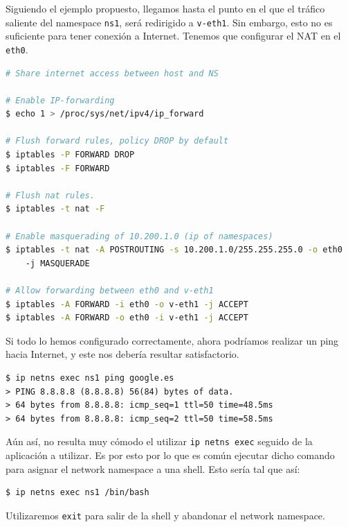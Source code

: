 \documentclass[a4paper, oneside, 12pt]{book}
\begin{document}
	\pagebreak

	\par \noindent Siguiendo el ejemplo propuesto, llegamos hasta el punto en el que el tráfico saliente del namespace \texttt{ns1}, será redirigido a \texttt{v-eth1}. Sin embargo, esto no es suficiente para tener conexión a Internet. Tenemos que configurar el NAT en el \texttt{eth0}.
	
	\begin{lstlisting}[language=bash, caption=Configuración de NAT para dar Internet a un network namespace]
# Share internet access between host and NS

# Enable IP-forwarding
$ echo 1 > /proc/sys/net/ipv4/ip_forward

# Flush forward rules, policy DROP by default
$ iptables -P FORWARD DROP
$ iptables -F FORWARD

# Flush nat rules.
$ iptables -t nat -F

# Enable masquerading of 10.200.1.0 (ip of namespaces)
$ iptables -t nat -A POSTROUTING -s 10.200.1.0/255.255.255.0 -o eth0 
	-j MASQUERADE

# Allow forwarding between eth0 and v-eth1
$ iptables -A FORWARD -i eth0 -o v-eth1 -j ACCEPT
$ iptables -A FORWARD -o eth0 -i v-eth1 -j ACCEPT
	\end{lstlisting}
	
	\addvspace{10px}
	
	\par \noindent Si todo lo hemos configurado correctamente, ahora podríamos realizar un ping hacia Internet, y este nos debería resultar satisfactorio.
	\begin{verbatim}
$ ip netns exec ns1 ping google.es
> PING 8.8.8.8 (8.8.8.8) 56(84) bytes of data.
> 64 bytes from 8.8.8.8: icmp_seq=1 ttl=50 time=48.5ms
> 64 bytes from 8.8.8.8: icmp_seq=2 ttl=50 time=58.5ms
	\end{verbatim}

	\addvspace{10px}
	
	\par \noindent Aún así, no resulta muy cómodo el utilizar \texttt{ip netns exec} seguido de la aplicación a utilizar. Es por esto por lo que es común ejecutar dicho comando para asignar el network namespace a una shell. Esto sería tal que así:
	\begin{verbatim}
$ ip netns exec ns1 /bin/bash
	\end{verbatim}
	\par \noindent Utilizaremos \texttt{exit} para salir de la shell y abandonar el network namespace.
	
\end{document}

